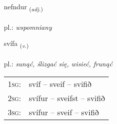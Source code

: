\documentclass[frontgrid, backgrid]{flacards}\usepackage[]{graphicx}\usepackage[]{xcolor}
\begin{document}
\renewcommand{\flhead}{\vskip5pt \fboxsep=0pt {\small\bfseries\footnotesize Lýsingarorð | przymiotnik}}
\renewcommand{\fcfoot}{\vskip5pt \fboxsep=0pt \hspace{2pt}{\small\bfseries\footnotesize 3K}}

\renewcommand{\blhead}{\vskip5pt {\small\bfseries\footnotesize Lýsingarorð | przymiotnik }}
\renewcommand{\bcfoot}{\vskip5pt \hspace{2pt}{\small\bfseries\footnotesize 3K}}


{nefndur \small{\textsubscript{(\textit{adj.})}} \\[1ex] %
\textphonetic{[nɛmtʏr]} \\
pl.: \emph{wspomniany} \\  [2ex]
\renewcommand*{\arraystretch}{0.8}
}

\renewcommand{\flhead}{\vskip5pt \fboxsep=0pt {\small\bfseries\footnotesize Sagnorð | czasownik}}
\renewcommand{\fcfoot}{\vskip5pt \fboxsep=0pt \hspace{2pt}{\small\bfseries\footnotesize 3K}}

\renewcommand{\blhead}{\vskip5pt {\small\bfseries\footnotesize Sagnorð | czasownik }}
\renewcommand{\bcfoot}{\vskip5pt \hspace{2pt}{\small\bfseries\footnotesize 3K}}


{svífa \small{\textsubscript{(\textit{v.})}} \\[1ex] %
\textphonetic{[sviːva]} \\
pl.: \emph{sunąć, ślizgać się, wisieć, frunąć} \\  [2ex]
\renewcommand*{\arraystretch}{0.8}
\begin{tabular}{p{1cm}l}
\textsc{1sg}: & svíf -- sveif -- svifið \\ 
\textsc{2sg}: & svífur -- sveifst -- svifið \\ 
\textsc{3sg}: & svífur -- sveif -- svifið \\ 
\end{tabular}
}
\end{document}
